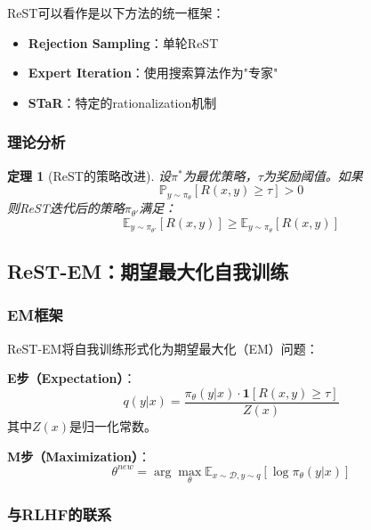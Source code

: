 \documentclass[12pt,a4paper]{article}
\newtheorem{theorem}{定理}[section]
\begin{document}
ReST可以看作是以下方法的统一框架：
\begin{itemize}
    \item \textbf{Rejection Sampling}：单轮ReST
    \item \textbf{Expert Iteration}：使用搜索算法作为"专家"
    \item \textbf{STaR}：特定的rationalization机制
\end{itemize}

\subsubsection{理论分析}

\begin{theorem}[ReST的策略改进]
设$\pi^*$为最优策略，$\tau$为奖励阈值。如果
\begin{equation}
\mathbb{P}_{y \sim \pi_\theta}[R(x,y) \geq \tau] > 0
\end{equation}
则ReST迭代后的策略$\pi_{\theta'}$满足：
\begin{equation}
\mathbb{E}_{y \sim \pi_{\theta'}}[R(x,y)] \geq \mathbb{E}_{y \sim \pi_\theta}[R(x,y)]
\end{equation}
\end{theorem}

\subsection{ReST-EM：期望最大化自我训练}

\subsubsection{EM框架}

ReST-EM将自我训练形式化为期望最大化（EM）问题：

\textbf{E步（Expectation）}：
\begin{equation}
q(y|x) = \frac{\pi_\theta(y|x) \cdot \mathbf{1}[R(x,y) \geq \tau]}{Z(x)}
\end{equation}
其中$Z(x)$是归一化常数。

\textbf{M步（Maximization）}：
\begin{equation}
\theta^{new} = \arg\max_\theta \mathbb{E}_{x \sim \mathcal{D}, y \sim q}[\log \pi_\theta(y|x)]
\end{equation}

\subsubsection{与RLHF的联系}
\end{document}
